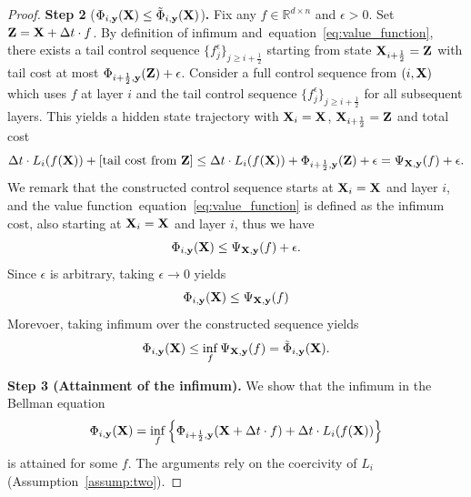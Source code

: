 \documentclass[10pt,a4paper]{amsart}
\newcommand{\bfX}{{\bf X}}
\newcommand{\bfZ}{{\bf Z}}
\newcommand{\bfy}{ {\bf y}}
\def\eqref#1{equation~\ref{#1}}
\begin{document}
\begin{proof}
    \textbf{Step 2} (${\Phi}_{i, \bfy}(\bfX) \leq \tilde{\Phi}_{i, \bfy}(\bfX)$)\textbf{.} Fix any $f \in \mathbb{R}^{d \times n}$ and $\epsilon > 0$. Set $\bfZ=\bfX + \Delta t \cdot f$. By definition of infimum and~\eqref{eq:value_function}, there exists a tail control sequence $\{ f_{j}^\epsilon \}_{j \geq i+\frac{1}{2}}$ starting from state $\bfX_{i+\frac{1}{2}}=\bfZ$ with tail cost at most $\Phi_{i+\frac{1}{2}, \bfy}(\bfZ) + \epsilon$. Consider a full control sequence from $(i, \bfX)$ which uses $f$ at layer $i$ and the tail control sequence $\{ f_{j}^\epsilon \}_{j \geq i+\frac{1}{2}}$ for all subsequent layers. This yields a hidden state trajectory with $\bfX_i=\bfX$, $\bfX_{i+\frac{1}{2}}=\bfZ$ and total cost
    \begin{equation}
        \Delta t \cdot L_i(f(\bfX)) + [\text{tail cost from $\bfZ$}] \leq \Delta t \cdot L_i(f(\bfX)) + \Phi_{i+\frac{1}{2}, \bfy}(\bfZ) +\epsilon = \Psi_{\bfX, \bfy}(f) + \epsilon.
    \end{equation}
    We remark that the constructed control sequence starts at $\bfX_i=\bfX$ and layer $i$, and the value function~\eqref{eq:value_function} is defined as the infimum cost, also starting at $\bfX_i=\bfX$ and layer $i$, thus we have
    \begin{equation}
        \Phi_{i, \bfy}(\bfX) \leq \Psi_{\bfX, \bfy}(f) + \epsilon.
    \end{equation}
    Since $\epsilon$ is arbitrary, taking $\epsilon \to 0$ yields
    \begin{equation}
        \Phi_{i, \bfy}(\bfX) \leq \Psi_{\bfX, \bfy}(f)
    \end{equation}
    Morevoer, taking infimum over the constructed sequence yields
    \begin{equation}
        \Phi_{i, \bfy}(\bfX) \leq \inf_f\Psi_{\bfX, \bfy}(f) =  \tilde{\Phi}_{i, \bfy}(\bfX).
    \end{equation}

    \textbf{Step 3 (Attainment of the infimum).} We show that the infimum in the Bellman equation
    \[
    {\Phi}_{i, \bfy}(\bfX) = \inf_{f} \left\{ \Phi_{i+\frac{1}{2}, \bfy}(\bfX + \Delta t \cdot f) + \Delta t \cdot L_i(f(\bfX)) \right\}
    \]
    is attained for some $f$. The arguments rely on the coercivity of $L_i$ (Assumption~\ref{assump:two}).


\end{proof}
\end{document}

